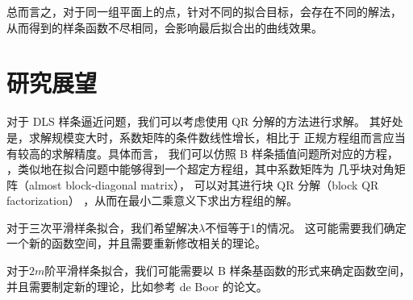 总而言之，对于同一组平面上的点，针对不同的拟合目标，会存在不同的解法，
从而得到的样条函数不尽相同，会影响最后拟合出的曲线效果。

\section{研究展望}
对于 DLS 样条逼近问题，我们可以考虑使用 QR 分解的方法进行求解。
其好处是，求解规模变大时，系数矩阵的条件数线性增长，相比于
正规方程组而言应当有较高的求解精度。具体而言，
我们可以仿照 B 样条插值问题所对应的方程，
，类似地在拟合问题中能够得到一个超定方程组，其中系数矩阵为
几乎块对角矩阵（almost block-diagonal matrix），
可以对其进行块 QR 分解（block QR factorization）
\cite{Boor1976SOLVEBLOKAP}，从而在最小二乘意义下求出方程组的解。

对于三次平滑样条拟合，我们希望解决$\lambda$不恒等于1的情况。
这可能需要我们确定一个新的函数空间，并且需要重新修改相关的理论。

对于$2m$阶平滑样条拟合，我们可能需要以 B 样条基函数的形式来确定函数空间，
并且需要制定新的理论，比如参考 de Boor 的论文\cite{Boor2001CALCULATIONOT}。

\newpage
\begingroup
    \printbibliography[title={参考文献}]
\endgroup
